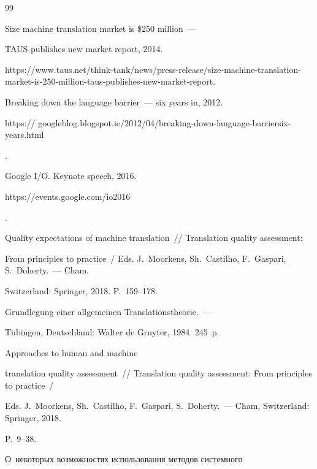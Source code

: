 {\small\frenchspacing

{%


\begin{thebibliography}{99}


Size machine translation market is \$250 million~--- 

TAUS publishes new market report, 2014. 

{\sf https://www.taus.net/think-tank/news/press-release/size-machine-translation-market-is-250-million-taus-publishes-new-market-report}.


 Breaking down the language barrier~--- six years in, 2012.  {\sf 

https:// googleblog.blogspot.ie/2012/04/breaking-down-language-barriersix-years.html}.


 Google I\!/\!O. Keynote speech, 2016. {\sf 

https://events.google.com/io2016}.


 Quality expectations of machine translation~/\!\!/ Translation quality assessment: 

From principles to practice~/ Eds. J.~Moorkens, Sh.~Castilho, F.~Gaspari, S.~Doherty.~--- Cham, 

Switzerland: Springer, 2018. P.~159--178.


 Grundlegung einer allgemeinen Translationstheorie.~--- 

T$\ddot{\mbox{u}}$bingen, Deutschland: Walter de Gruyter, 1984. 245~p.


 Approaches to human and machine 

translation quality assessment~/\!\!/ Translation quality assessment: From principles to practice~/ 

Eds. J.~Moorkens, Sh.~Castilho, F.~Gaspari, S.~Doherty.~--- Cham, Switzerland: Springer, 2018. 

P.~9--38.


 О~некоторых возможностях использования методов системного 


\end{thebibliography}}}
